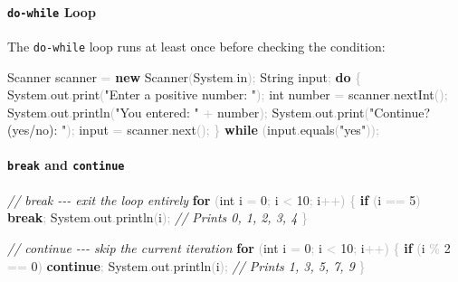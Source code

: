 \documentclass[
  justified,
  openright,
]{tufte-book}
\let\subsection\paragraph
\let\paragraph\paragraph
\newcommand{\KeywordTok}[1]{\textcolor{CodeKeyword}{\textbf{#1}}}  %
\newcommand{\StringTok}[1]{\textcolor{CodeString}{#1}}              %
\newcommand{\CommentTok}[1]{\textcolor{CodeComment}{\textit{#1}}}  %
\newcommand{\CodeNumTok}[1]{\textcolor{CodeNumber}{#1}}             %
\newcommand{\CodeFuncTok}[1]{\textcolor{CodeKeyword}{#1}}           %
\newcommand{\CodeTypeTok}[1]{\textcolor{CodeType}{#1}}              %
\newcommand{\OperatorTok}[1]{\textcolor{DarkGray}{#1}}              %
\newenvironment{Shaded}{%
  \begin{mdframed}[style=TufteCode]%
}{%
  \end{mdframed}%
}
\let\subsection\paragraph
\let\paragraph\paragraph
\begin{document}
\subsection{\texorpdfstring{\texttt{do-while}
Loop}{do-while Loop}}\label{do-while-loop}

The \texttt{do-while} loop runs at least once before checking the
condition:

\begin{Shaded}
\begin{Highlighting}[]
Scanner scanner \OperatorTok{=} \KeywordTok{new} Scanner\OperatorTok{(}System\OperatorTok{.}\CodeFuncTok{in}\OperatorTok{);}
String input\OperatorTok{;}
\KeywordTok{do} \OperatorTok{\{}
    System\OperatorTok{.}\CodeFuncTok{out}\OperatorTok{.}\CodeFuncTok{print}\OperatorTok{(}\StringTok{"Enter a positive number: "}\OperatorTok{);}
    \CodeTypeTok{int} number \OperatorTok{=} scanner\OperatorTok{.}\CodeFuncTok{nextInt}\OperatorTok{();}
    System\OperatorTok{.}\CodeFuncTok{out}\OperatorTok{.}\CodeFuncTok{println}\OperatorTok{(}\StringTok{"You entered: "} \OperatorTok{+} number\OperatorTok{);}
    System\OperatorTok{.}\CodeFuncTok{out}\OperatorTok{.}\CodeFuncTok{print}\OperatorTok{(}\StringTok{"Continue? (yes/no): "}\OperatorTok{);}
    input \OperatorTok{=} scanner\OperatorTok{.}\CodeFuncTok{next}\OperatorTok{();}
\OperatorTok{\}} \KeywordTok{while} \OperatorTok{(}input\OperatorTok{.}\CodeFuncTok{equals}\OperatorTok{(}\StringTok{"yes"}\OperatorTok{));}
\end{Highlighting}
\end{Shaded}

\subsection{\texorpdfstring{\texttt{break} and
\texttt{continue}}{break and continue}}\label{break-and-continue-1}

\begin{Shaded}
\begin{Highlighting}[]
\CommentTok{// break {-}{-}{-} exit the loop entirely}
\KeywordTok{for} \OperatorTok{(}\CodeTypeTok{int} i \OperatorTok{=} \CodeNumTok{0}\OperatorTok{;} i \OperatorTok{\textless{}} \CodeNumTok{10}\OperatorTok{;} i\OperatorTok{++)} \OperatorTok{\{}
    \KeywordTok{if} \OperatorTok{(}i \OperatorTok{==} \CodeNumTok{5}\OperatorTok{)} \KeywordTok{break}\OperatorTok{;}
    System\OperatorTok{.}\CodeFuncTok{out}\OperatorTok{.}\CodeFuncTok{println}\OperatorTok{(}i\OperatorTok{);}   \CommentTok{// Prints 0, 1, 2, 3, 4}
\OperatorTok{\}}
 
\CommentTok{// continue {-}{-}{-} skip the current iteration}
\KeywordTok{for} \OperatorTok{(}\CodeTypeTok{int} i \OperatorTok{=} \CodeNumTok{0}\OperatorTok{;} i \OperatorTok{\textless{}} \CodeNumTok{10}\OperatorTok{;} i\OperatorTok{++)} \OperatorTok{\{}
    \KeywordTok{if} \OperatorTok{(}i \OperatorTok{\%} \CodeNumTok{2} \OperatorTok{==} \CodeNumTok{0}\OperatorTok{)} \KeywordTok{continue}\OperatorTok{;}
    System\OperatorTok{.}\CodeFuncTok{out}\OperatorTok{.}\CodeFuncTok{println}\OperatorTok{(}i\OperatorTok{);}   \CommentTok{// Prints 1, 3, 5, 7, 9}
\OperatorTok{\}}
\end{Highlighting}
\end{Shaded}
\end{document}
